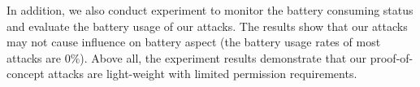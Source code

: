 In addition, we also conduct experiment to monitor the battery consuming
status and evaluate the battery usage of our attacks. The results show
that our attacks may not cause influence on battery aspect (the
battery usage rates of most attacks are $0\%$).  Above all, the
experiment results demonstrate that our proof-of-concept attacks are
light-weight with limited permission requirements.









